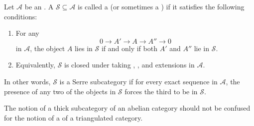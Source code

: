 \begin{definition} \label{definition:serre_subcategory_of_an_abelian_category}
    Let $\mathcal{A}$ be an . A  $\mathcal{S} \subseteq \mathcal{A}$ is called a  (or sometimes a ) if it satisfies the following conditions:
 
    \begin{enumerate}
        \item For any 
        $$ 0 \to A' \to A \to A'' \to 0 $$
        in $\mathcal{A}$, the object $A$ lies in $\mathcal{S}$ if and only if both $A'$ and $A''$ lie in $\mathcal{S}$.
        
        \item Equivalently, $\mathcal{S}$ is closed under taking , , and extensions in $\mathcal{A}$.
    \end{enumerate}

    In other words, $\mathcal{S}$ is a Serre subcategory if for every exact sequence in $\mathcal{A}$, the presence of any two of the objects in $\mathcal{S}$ forces the third to be in $\mathcal{S}$.

    The notion of a thick subcategory of an abelian category should not be confused for the notion of a  of a triangulated category.
\end{definition}